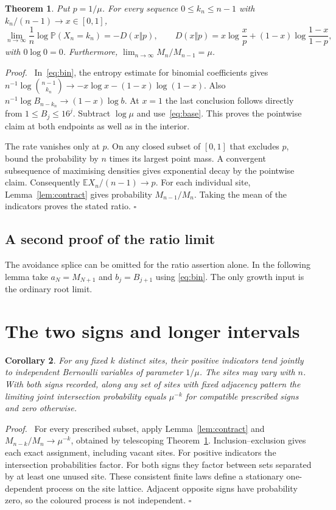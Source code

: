 \documentclass[11pt]{article}
\newtheorem{theorem}{Theorem}
\newtheorem{corollary}[theorem]{Corollary}
\newenvironment{proof}{\par\noindent\textit{Proof.}\ }{\unskip\nobreak\hfill\(\square\)\par}
\newcommand{\Prb}{\mathbb P}
\newcommand{\E}{\mathbb E}
\newcommand{\bin}[2]{\binom{#1}{#2}}
\begin{document}
\begin{theorem}\label{thm:ratio}
Put \(p=1/\mu\). For every sequence \(0\le k_n\le n-1\) with
\(k_n/(n-1)\to x\in[0,1]\),
\[
 \lim_{n\to\infty}\frac1n\log\Prb(X_n=k_n)
 =-D(x\Vert p),\qquad
 D(x\Vert p)=x\log\frac{x}{p}+(1-x)\log\frac{1-x}{1-p},
\]
with \(0\log0=0\). Furthermore, \(\displaystyle\lim_{n\to\infty}M_n/M_{n-1}=\mu\).
\end{theorem}
\begin{proof}
In~\eqref{eq:bin}, the entropy estimate for binomial coefficients gives
\(n^{-1}\log\bin{n-1}{k_n}\to-x\log x-(1-x)\log(1-x)\).
Also \(n^{-1}\log B_{n-k_n}\to(1-x)\log b\). At \(x=1\) the
last conclusion follows directly from \(1\le B_j\le 16^j\).
Subtract \(\log\mu\) and use~\eqref{eq:base}. This proves the pointwise
claim at both endpoints as well as in the interior.

The rate vanishes only at \(p\). On any closed subset of \([0,1]\)
that excludes \(p\), bound the probability by \(n\) times its largest
point mass. A convergent subsequence of maximising densities gives
exponential decay by the pointwise claim. Consequently
\(\E X_n/(n-1)\to p\). For each individual site,
Lemma~\ref{lem:contract} gives probability \(M_{n-1}/M_n\).
Taking the mean of the indicators proves the stated ratio.
\end{proof}


\subsection*{A second proof of the ratio limit}
The avoidance splice can be omitted for the ratio assertion alone.
In the following lemma take \(a_N=M_{N+1}\) and \(b_j=B_{j+1}\)
using \eqref{eq:bin}. The only growth input is the ordinary root limit.


\section{The two signs and longer intervals}
\begin{corollary}
For any fixed \(k\) distinct sites, their positive indicators tend
jointly to independent Bernoulli variables of parameter \(1/\mu\).
The sites may vary with \(n\). With both signs recorded, along any set
of sites with fixed adjacency pattern the limiting joint intersection
probability equals \(\mu^{-k}\) for compatible prescribed signs and
zero otherwise.
\end{corollary}
\begin{proof}
For every prescribed subset, apply Lemma~\ref{lem:contract} and
\(M_{n-k}/M_n\to\mu^{-k}\), obtained by telescoping Theorem~\ref{thm:ratio}.
Inclusion--exclusion gives each exact assignment, including vacant
sites. For positive indicators the intersection probabilities factor.
For both signs they factor between sets separated by at least one unused
site. These consistent finite laws define a stationary one-dependent
process on the site lattice. Adjacent opposite signs have probability
zero, so the coloured process is not independent.
\end{proof}
\end{document}
